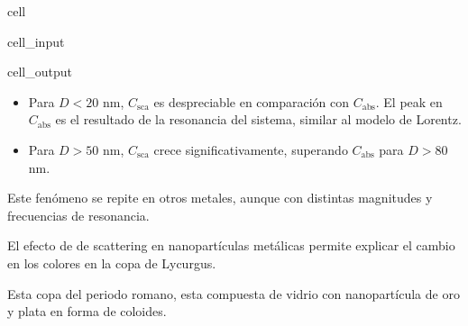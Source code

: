 \documentclass[letterpaper,10pt,english]{jupyterBook}
\let\sphinxpxdimen\pdfpxdimen\else\newdimen\sphinxpxdimen
\begin{document}
\begin{sphinxuseclass}{cell}\begin{sphinxVerbatimInput}

\begin{sphinxuseclass}{cell_input}
\begin{sphinxVerbatim}[commandchars=\\\{\}]
\end{sphinxVerbatim}

\end{sphinxuseclass}\end{sphinxVerbatimInput}
\begin{sphinxVerbatimOutput}

\begin{sphinxuseclass}{cell_output}
\noindent{}

\end{sphinxuseclass}\end{sphinxVerbatimOutput}

\end{sphinxuseclass}\begin{itemize}
\item {} 
\sphinxAtStartPar
Para \(D < 20\) nm, \(C_\mathrm{sca}\) es despreciable en comparación con \(C_\mathrm{abs}\). El peak en \(C_\mathrm{abs}\) es el resultado de la resonancia del sistema, similar al modelo de Lorentz.

\item {} 
\sphinxAtStartPar
Para \(D > 50\) nm, \(C_\mathrm{sca}\) crece significativamente, superando \(C_\mathrm{abs}\) para \(D > 80\) nm.

\end{itemize}

\sphinxAtStartPar
Este fenómeno se repite en otros metales, aunque con distintas magnitudes y frecuencias de resonancia.

\sphinxAtStartPar
El efecto de de scattering en nanopartículas metálicas permite explicar el cambio en los colores en la copa de Lycurgus.

\noindent{\hspace*{\fill}\sphinxincludegraphics[width=300\sphinxpxdimen]{{LycurgusCup}.jpg}\hspace*{\fill}}

\sphinxAtStartPar
Esta copa del periodo romano, esta compuesta de vidrio con nanopartícula de oro y plata en forma de coloides.
\end{document}
